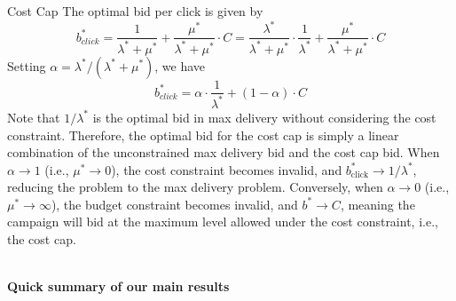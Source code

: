 \documentclass[../main.tex]{subfiles}
\begin{document}
\begin{section}{Cost Cap}
	The optimal bid per click is given by 
	\begin{equation}
		b^*_{click} = \frac{1}{\lambda^* + \mu^*} + \frac{\mu^*}{\lambda^* + \mu^*} \cdot C =  \frac{\lambda^*}{\lambda^* + \mu^*} \cdot \frac{1}{\lambda^*}+ \frac{\mu^*}{\lambda^* + \mu^*} \cdot C
	\end{equation}
    Setting $\alpha = \lambda^*/(\lambda^* + \mu^*)$, we have 
    \begin{equation}
    	b^*_{click}  =  \alpha \cdot \frac{1}{\lambda^*}+ (1-\alpha) \cdot C
    \end{equation}
	Note that \(1 / \lambda^*\) is the optimal bid in max delivery without considering the cost constraint. Therefore, the optimal bid for the cost cap is simply a linear combination of the unconstrained max delivery bid and the cost cap bid. When \(\alpha \to 1\) (i.e., \(\mu^* \to 0\)), the cost constraint becomes invalid, and \(b^*_{\text{click}} \to 1 / \lambda^*\), reducing the problem to the max delivery problem. Conversely, when \(\alpha \to 0\) (i.e., \(\mu^* \to \infty\)), the budget constraint becomes invalid, and \(b^* \to C\), meaning the campaign will bid at the maximum level allowed under the cost constraint, i.e., the cost cap.
	
	
	\textbf{\\Quick summary of our main results}
	
	\end{section}
	
\end{document}
